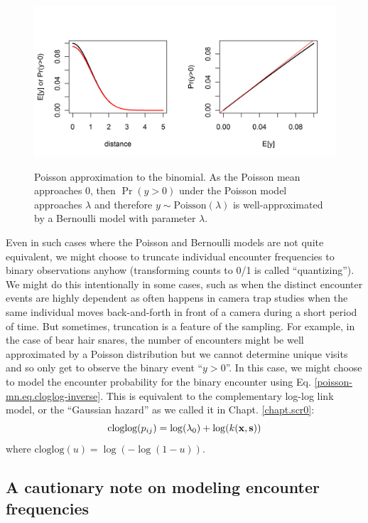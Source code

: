 \begin{figure}
\centering
\includegraphics[width=5in,height=2.5in]{Ch9-PoisMn/figs/Poisson-Bern.png}
\caption{
Poisson approximation to the binomial. As the Poisson mean
approaches 0, then $\Pr(y>0)$ under the Poisson model approaches
$\lambda$ and therefore $y \sim \mbox{Poisson}(\lambda)$ is
well-approximated by a Bernoulli model with parameter $\lambda$.  }
\label{poisson-mn.fig.poissonbern}
\end{figure}

Even in such cases where the Poisson and Bernoulli models are not
quite equivalent, we might choose to truncate individual encounter
frequencies to binary observations anyhow (transforming counts to 0/1
is called ``quantizing'').  We might do this intentionally in some
cases, such as when the distinct encounter events are highly dependent
as often happens in camera trap studies when the same individual moves
back-and-forth in front of a camera during a short period of time.
But sometimes, truncation is a feature of the sampling. For example,
in the case of bear hair snares, the number of encounters might be
well approximated by a Poisson distribution but we cannot determine
unique visits and so only get to observe the binary event ``$y>0$''.
In this case, we might choose to model the encounter probability for
the binary encounter using Eq. \ref{poisson-mn.eq.cloglog-inverse}.
This is equivalent to the complementary log-log link model, or the
``Gaussian hazard'' as we called it in Chapt. \ref{chapt.scr0}:
\[
\mbox{cloglog}(p_{ij}) = \log(\lambda_{0})  + \log(k({\bf x},{\bf s}))
\]
where $\mbox{cloglog}(u) = \log(-\log(1-u))$.


\subsection{A cautionary note on modeling encounter frequencies}

